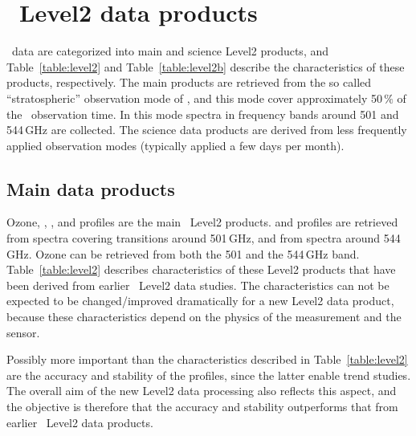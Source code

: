 \section{\smr\ Level2 data products}

\smr\ data are categorized into main and science Level2 products,
and Table~\ref{table:level2} and Table~\ref{table:level2b} describe the
characteristics of these products, respectively.
The main products are retrieved from the so called ``stratospheric'' observation mode
of \smr, and this mode cover approximately 50\,\(\%\) of the \smr\ observation time.
In this mode spectra in frequency bands around 501 and 544\,GHz are collected.
The science data products are derived from less frequently applied observation modes
(typically applied a few days per month).


\subsection{Main data products}

Ozone, , , and  profiles
are the main \smr\ Level2 products.
 and  profiles are retrieved from spectra covering
transitions around 501\,GHz, and  from spectra around 544\,GHz.
Ozone can be retrieved from both the 501 and the 544\,GHz band.
Table~\ref{table:level2} describes characteristics of these Level2 products
that have been derived from earlier \smr\ Level2 data studies.
The characteristics can not be expected to be changed/improved dramatically
for a new Level2 data product,
because these characteristics depend on the physics of the measurement and
the sensor. 

Possibly more important than the characteristics described in
Table~\ref{table:level2} are the accuracy and stability of the profiles, since
the latter enable trend studies.
The overall aim of the new Level2 data processing also reflects
this aspect, and the objective is therefore that the accuracy
and stability outperforms that from earlier \smr\ Level2 data products. 




